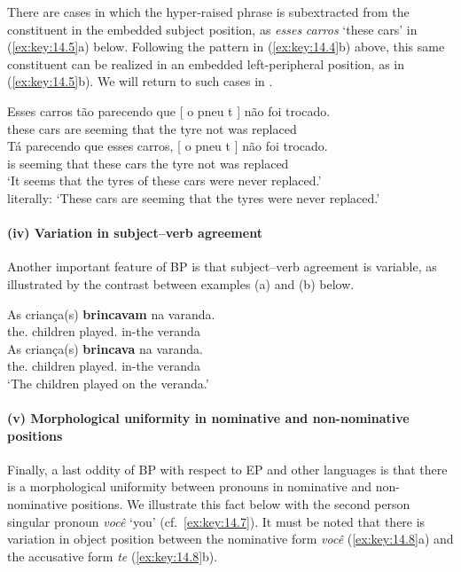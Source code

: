 \documentclass[output=paper]{langsci/langscibook}
\begin{document}
There are cases in which the hyper-raised phrase is subextracted from the
constituent in the embedded subject position, as \emph{esses} \emph{carros}
‘these cars’ in (\ref{ex:key:14.5}a) below. Following the pattern in (\ref{ex:key:14.4}b)
above, this same constituent can be realized in an embedded left-peripheral
position, as in (\ref{ex:key:14.5}b). We will return to such cases in
.

\ea\label{ex:key:14.5}
    \ea
	\gll    Esses carros tão parecendo que [ o pneu t ] não foi trocado.\\
            these cars are seeming that {} the tyre {} {} not was replaced\\
    \ex
    \gll    Tá parecendo que esses carros, [ o pneu t ] não foi trocado.\\
            is seeming that these cars {} the tyre {} {} not was replaced\\
    \glt    ‘It seems that the tyres of these cars were never replaced.’\\
            literally: ‘These cars are seeming that the tyres were never replaced.’
    \z
\z

\paragraph*{(iv) Variation in subject--verb agreement}

Another important feature of \gls{BP} is that subject--verb agreement is
variable, as illustrated by the contrast between examples (a) and (b) below.

\ea%
    \label{ex:key:14.6}
	\ea
	\gll    As criança(s) \textbf{brincavam} na varanda.\\
            the.\Pl{}  children played.\Tpl{} in-the veranda\\
    \ex
    \gll    As criança(s) \textbf{brincava} na varanda.\\
            the.\Pl{}  children played.\Tsg{} in-the veranda\\
    \glt    ‘The children played on the veranda.’
    \z
\z

\paragraph*{(v) Morphological uniformity in nominative and non-nominative positions}

Finally, a last oddity of \gls{BP} with respect to \gls{EP} and other 
languages is that there is a morphological uniformity between pronouns in
nominative and non-nominative positions. We illustrate this fact below with the
second person singular pronoun \emph{você} ‘you’ (cf.\ \eqref{ex:key:14.7}). It
must be noted that there is variation in object position between the
nominative form \emph{você} (\ref{ex:key:14.8}a) and the accusative form
\emph{te} (\ref{ex:key:14.8}b).
\end{document}
